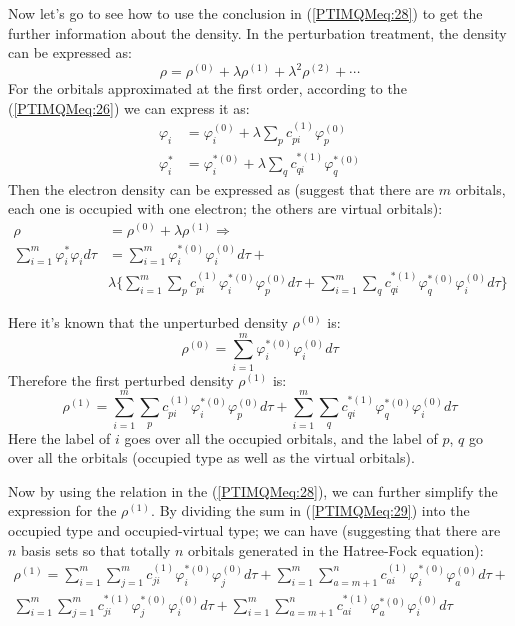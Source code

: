 Now let's go to see how to use the conclusion in (\ref{PTIMQMeq:28})
to get the further information about the density. In the
perturbation treatment, the density can be expressed as:
\begin{equation}\label{}
\rho = \rho^{(0)} + \lambda\rho^{(1)} +\lambda^{2}\rho^{(2)} +
\cdots
\end{equation}
For the orbitals approximated at the first order, according to the
 (\ref{PTIMQMeq:26}) we can express it as:
\begin{align}\label{}
\varphi_{i} &= \varphi^{(0)}_{i} +
\lambda\sum_{p}c^{(1)}_{pi}\varphi^{(0)}_{p} \nonumber \\
\varphi^{*}_{i} &= \varphi^{*(0)}_{i} +
\lambda\sum_{q}c^{*(1)}_{qi}\varphi^{*(0)}_{q}
\end{align}
Then the electron density can be expressed as (suggest that there
are $m$ orbitals, each one is occupied with one electron; the others
are virtual orbitals):
\begin{align}\label{}
\rho &= \rho^{(0)} + \lambda\rho^{(1)} \Rightarrow \nonumber \\
\sum_{i=1}^{m}\varphi^{*}_{i}\varphi_{i}d\tau &=
\sum_{i=1}^{m}\varphi^{*(0)}_{i}\varphi^{(0)}_{i}d\tau + \nonumber \\
&\lambda\Bigg\{\sum_{i=1}^{m}\sum_{p}c^{(1)}_{pi}
\varphi^{*(0)}_{i}\varphi^{(0)}_{p}d\tau  +
\sum_{i=1}^{m}\sum_{q}c^{*(1)}_{qi}
\varphi^{*(0)}_{q}\varphi^{(0)}_{i}d\tau \Bigg\}
\end{align}

Here it's known that the unperturbed density $\rho^{(0)}$ is:
\begin{equation}\label{}
\rho^{(0)} = \sum_{i=1}^{m}\varphi^{*(0)}_{i}\varphi^{(0)}_{i}d\tau
\end{equation}
Therefore the first perturbed density $\rho^{(1)}$ is:
\begin{equation}\label{PTIMQMeq:29}
\rho^{(1)} = \sum_{i=1}^{m}\sum_{p}c^{(1)}_{pi}
\varphi^{*(0)}_{i}\varphi^{(0)}_{p}d\tau  +
\sum_{i=1}^{m}\sum_{q}c^{*(1)}_{qi}
\varphi^{*(0)}_{q}\varphi^{(0)}_{i}d\tau
\end{equation}
Here the label of $i$ goes over all the occupied orbitals, and the
label of $p$, $q$ go over all the orbitals (occupied type as well as
the virtual orbitals).

Now by using the relation in the (\ref{PTIMQMeq:28}), we can further
simplify the expression for the $\rho^{(1)}$. By dividing the sum in
(\ref{PTIMQMeq:29}) into the occupied type and occupied-virtual
type; we can have (suggesting that there are $n$ basis sets so that
totally $n$ orbitals generated in the Hatree-Fock equation):
\begin{multline}\label{}
\rho^{(1)} = \sum_{i=1}^{m}\sum_{j=1}^{m}c^{(1)}_{ji}
\varphi^{*(0)}_{i}\varphi^{(0)}_{j}d\tau +
\sum_{i=1}^{m}\sum_{a=m+1}^{n}c^{(1)}_{ai}
\varphi^{*(0)}_{i}\varphi^{(0)}_{a}d\tau  + \\
\sum_{i=1}^{m}\sum_{j=1}^{m}c^{*(1)}_{ji}
\varphi^{*(0)}_{j}\varphi^{(0)}_{i}d\tau +
\sum_{i=1}^{m}\sum_{a=m+1}^{n}c^{*(1)}_{ai}
\varphi^{*(0)}_{a}\varphi^{(0)}_{i}d\tau
\end{multline}






